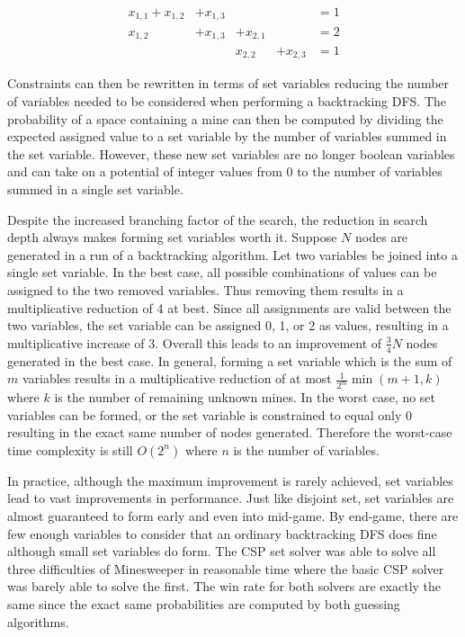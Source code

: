 \documentclass[letterpaper]{article}
\begin{document}
\begin{equation}\label{eq:set_variables}
\begin{aligned}
x_{1,1} + x_{1,2} &+ x_{1,3}&&&= 1\\
x_{1,2} &+ x_{1,3} &+ x_{2,1}&&= 2\\
&&x_{2,2} &+ x_{2,3} &= 1
\end{aligned}
\end{equation}

Constraints can then be rewritten in terms of set variables reducing the number of variables needed to be considered when performing a backtracking DFS.  The probability of a space containing a mine can then be computed by dividing the expected assigned value to a set variable by the number of variables summed in the set variable.  However, these new set variables are no longer boolean variables and can take on a potential of integer values from 0 to the number of variables summed in a single set variable.  

Despite the increased branching factor of the search, the reduction in search depth always makes forming set variables worth it.  Suppose $N$ nodes are generated in a run of a backtracking algorithm.  Let two variables be joined into a single set variable.  In the best case, all possible combinations of values can be assigned to the two removed variables.  Thus removing them results in a multiplicative reduction of 4 at best.  Since all assignments are valid between the two variables, the set variable can be assigned 0, 1, or 2 as values, resulting in a multiplicative increase of 3.  Overall this leads to an improvement of $\frac34 N$ nodes generated in the best case.  In general, forming a set variable which is the sum of $m$ variables results in a multiplicative reduction of at most $\frac{1}{2^m}\min(m+1,k)$ where $k$ is the number of remaining unknown mines.  In the worst case, no set variables can be formed, or the set variable is constrained to equal only 0 resulting in the exact same number of nodes generated.  Therefore the worst-case time complexity is still $O(2^n)$ where $n$ is the number of variables.

In practice, although the maximum improvement is rarely achieved, set variables lead to vast improvements in performance.  Just like disjoint set, set variables are almost guaranteed to form early and even into mid-game.  By end-game, there are few enough variables to consider that an ordinary backtracking DFS does fine although small set variables do form.  The CSP set solver was able to solve all three difficulties of Minesweeper in reasonable time where the basic CSP solver was barely able to solve the first.  The win rate for both solvers are exactly the same since the exact same probabilities are computed by both guessing algorithms.
\end{document}
